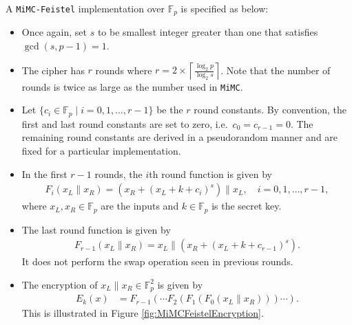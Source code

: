 \documentclass[10pt]{article}
\begin{document}
A \texttt{MiMC-Feistel} implementation over $\mathbb{F}_p$ is specified as below:
\begin{itemize}
  \item Once again, set $s$ to be smallest integer greater than one that satisfies $\gcd(s, p-1)=1$.
  \item The cipher has $r$ rounds where $r = 2\times\left\lceil \frac{\log_2 p}{\log_2 s}  \right\rceil$. Note that the number of rounds is twice as large as the number used in \texttt{MiMC}.
  \item Let $\{c_i \in \mathbb{F}_p \mid i=0,1,\ldots,r-1 \}$ be the $r$ round constants. By convention, the first and last round constants are set to zero, i.e.~$c_0=c_{r-1} = 0$. The remaining round constants are derived in a pseudorandom manner and are fixed for a particular implementation.
  \item In the first $r-1$ rounds, the $i$th round function is given by 
    \begin{align*}
    F_i(x_L \| x_R)  =  \left( x_R + \left( x_L+k+c_i\right)^s  \right) \| x_L, \quad i=0,1,\ldots,r-1,
    \end{align*}
    where $x_L, x_R \in \mathbb{F}_p$ are the inputs and $k \in \mathbb{F}_p$ is the secret key.
  \item The last round function is given by
    \begin{align*}
    F_{r-1}(x_L \| x_R) =  x_L\| \left( x_R + \left( x_L+k+c_{r-1}\right)^s \right).
    \end{align*}
    It does not perform the swap operation seen in previous rounds.
  \item The encryption of $x_L \| x_R \in \mathbb{F}_p^2$ is given by
    \begin{align*}
      E_k(x) & = F_{r-1}(\cdots F_2(F_1(F_0(x_L \| x_R))) \cdots).
    \end{align*}
    This is illustrated in Figure \ref{fig:MiMCFeistelEncryption}.
\end{itemize}
\end{document}
